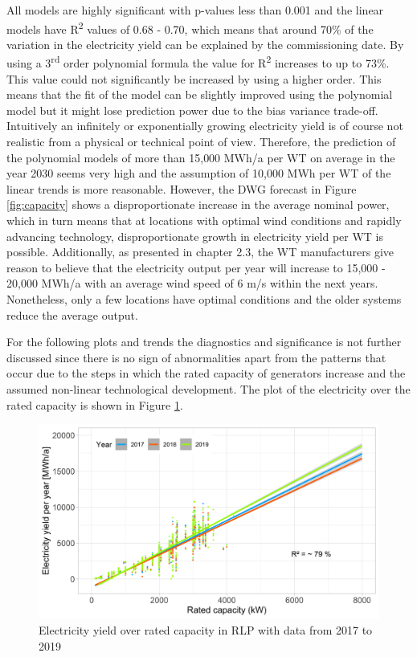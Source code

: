 \documentclass[a4paper,11pt]{article}
\begin{document}
All models are highly significant with p-values less than 0.001 and the linear models have R\textsuperscript{2} values of 0.68 - 0.70, which means that around 70\% of the variation in the electricity yield can be explained by the commissioning date. By using a 3\textsuperscript{rd} order polynomial formula the value for R\textsuperscript{2} increases to up to 73\%. This value could not significantly be increased by using a higher order. This means that the fit of the model can be slightly improved using the polynomial model but it might lose prediction power due to the bias variance trade-off. Intuitively an infinitely or exponentially growing electricity yield is of course not realistic from a physical or technical point of view. Therefore, the prediction of the polynomial models of more than 15,000 MWh/a per WT on average in the year 2030 seems very high and the assumption of 10,000 MWh per WT of the linear trends is more reasonable. However, the DWG forecast in Figure \ref{fig:capacity} shows a disproportionate increase in the average nominal power, which in turn means that at locations with optimal wind conditions and rapidly advancing technology, disproportionate growth in electricity yield per WT is possible. Additionally, as presented in chapter 2.3, the WT manufacturers give reason to believe that the electricity output per year will increase to 15,000 - 20,000 MWh/a with an average wind speed of 6 m/s within the next years. Nonetheless, only a few locations have optimal conditions and the older systems reduce the average output.

For the following plots and trends the diagnostics and significance is not further discussed since there is no sign of abnormalities apart from the patterns that occur due to the steps in which the rated capacity of generators increase and the assumed non-linear technological development. The plot of the electricity over the rated capacity is shown in Figure \ref{fig:eratedcapacity}.
\begin{figure}[H]

{\centering \includegraphics[width=1\linewidth]{data/Amprion/results_of_analysis/electricity_rated_capacity} 

}

\caption{Electricity yield over rated capacity in RLP with data from 2017 to 2019}\label{fig:eratedcapacity}
\end{figure}
\newpage
\end{document}
